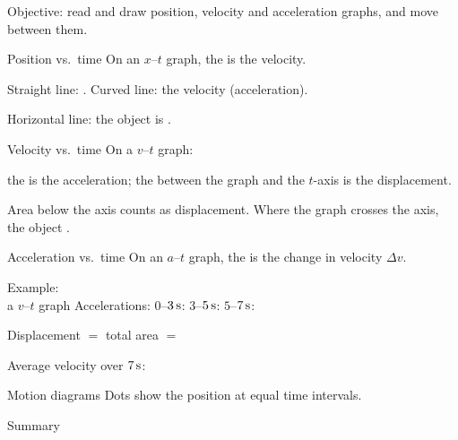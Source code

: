 \begin{center}\textsf{\small\color{apgrey}Objective: read and draw position, velocity and acceleration graphs, and move between them.}\end{center}
\begin{nrow}{Position vs.\ time}
On an $x$--$t$ graph, the  is the velocity.\par
Straight line: . \quad Curved line: the velocity  (acceleration).\par
Horizontal line: the object is .
\end{nrow}
\begin{nrow}{Velocity vs.\ time}
On a $v$--$t$ graph:\par
the  is the acceleration; \quad the  between the graph and the $t$-axis is the displacement.\par
Area below the axis counts as  displacement. \quad Where the graph crosses the axis, the object .
\end{nrow}
\begin{nrow}{Acceleration vs.\ time}
On an $a$--$t$ graph, the  is the change in velocity $\Delta v$.
\end{nrow}
\begin{nrow}{Example:\\ a $v$--$t$ graph}
Accelerations: $0$--$3\,\mathrm{s}$: \fillin{$2\mss$} \quad $3$--$5\,\mathrm{s}$:  \quad $5$--$7\,\mathrm{s}$: \fillin{$-3\mss$}\par
Displacement $=$ total area $=$ \par
Average velocity over $7\,\mathrm{s}$: 
\end{nrow}
\begin{nrow}{Motion diagrams}
Dots show the position at equal time intervals.\par
{}
\end{nrow}
\begin{nrow}{Summary}
\else\vspace{2.4cm}\fi
\end{nrow}

